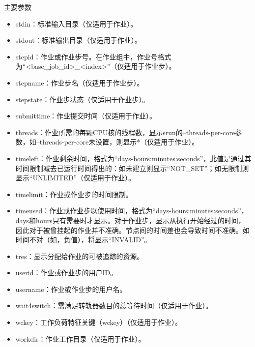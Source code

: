\begin{frame}[fragile]{主要参数}
\begin{itemize}
\begin{itemize}
\begin{itemize}
    \item stdin：标准输入目录（仅适用于作业）。
    \item stdout：标准输出目录（仅适用于作业）。
    \item stepid：作业或作业步号。在作业组中，作业号格式为``<base\_job\_id>\_<index>''（仅适用于作业步）。
    \item stepname：作业步名（仅适用于作业步）。
    \item stepstate：作业步状态（仅适用于作业步）。
    \item submittime：作业提交时间（仅适用于作业）。
    \item threads：作业所需的每颗CPU核的线程数，显示srun的--threads-per-core参数，如--threads-per-core未设置，则显示*（仅适用于作业）。
    \item timeleft：作业剩余时间，格式为``days-hours:minutes:seconds''，此值是通过其时间限制减去已运行时间得出的：如未建立则显示``NOT\_SET''；如无限制则显示``UNLIMITED''（仅适用于作业）。
    \item timelimit：作业或作业步的时间限制。
    \item timeused：作业或作业步以使用时间，格式为``days-hours:minutes:seconds''，days和hours只有需要时才显示。对于作业步，显示从执行开始经过的时间，因此对于被曾挂起的作业并不准确。节点间的时间差也会导致时间不准确。如时间不对（如，负值），将显示``INVALID''。
    \item tres：显示分配给作业的可被追踪的资源。
    \item userid：作业或作业步的用户ID。
    \item username：作业或作业步的用户名。
    \item wait4switch：需满足转轨器数目的总等待时间（仅适用于作业）。
    \item wckey：工作负荷特征关键（wckey）（仅适用于作业）。
    \item workdir：作业工作目录（仅适用于作业）。
\end{itemize}
\end{itemize}
\end{itemize}
\end{frame}

